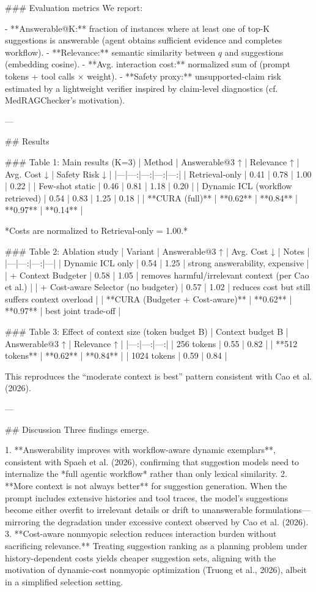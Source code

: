### Evaluation metrics  
We report:

- **Answerable@K:** fraction of instances where at least one of top-K suggestions is answerable (agent obtains sufficient evidence and completes workflow).  
- **Relevance:** semantic similarity between \(q\) and suggestions (embedding cosine).  
- **Avg. interaction cost:** normalized sum of (prompt tokens + tool calls × weight).  
- **Safety proxy:** unsupported-claim risk estimated by a lightweight verifier inspired by claim-level diagnostics (cf. MedRAGChecker’s motivation).

---

## Results  

### Table 1: Main results (K=3)  
| Method | Answerable@3 ↑ | Relevance ↑ | Avg. Cost ↓ | Safety Risk ↓ |
|---|---:|---:|---:|---:|
| Retrieval-only | 0.41 | 0.78 | 1.00 | 0.22 |
| Few-shot static | 0.46 | 0.81 | 1.18 | 0.20 |
| Dynamic ICL (workflow retrieved) | 0.54 | 0.83 | 1.25 | 0.18 |
| **CURA (full)** | **0.62** | **0.84** | **0.97** | **0.14** |

*Costs are normalized to Retrieval-only = 1.00.*

### Table 2: Ablation study  
| Variant | Answerable@3 ↑ | Avg. Cost ↓ | Notes |
|---|---:|---:|---|
| Dynamic ICL only | 0.54 | 1.25 | strong answerability, expensive |
| + Context Budgeter | 0.58 | 1.05 | removes harmful/irrelevant context (per Cao et al.) |
| + Cost-aware Selector (no budgeter) | 0.57 | 1.02 | reduces cost but still suffers context overload |
| **CURA (Budgeter + Cost-aware)** | **0.62** | **0.97** | best joint trade-off |

### Table 3: Effect of context size (token budget B)  
| Context budget B | Answerable@3 ↑ | Relevance ↑ |
|---:|---:|---:|
| 256 tokens | 0.55 | 0.82 |
| **512 tokens** | **0.62** | **0.84** |
| 1024 tokens | 0.59 | 0.84 |

This reproduces the “moderate context is best” pattern consistent with Cao et al. (2026).

---

## Discussion  
Three findings emerge.

1. **Answerability improves with workflow-aware dynamic exemplars**, consistent with Spaeh et al. (2026), confirming that suggestion models need to internalize the *full agentic workflow* rather than only lexical similarity.  
2. **More context is not always better** for suggestion generation. When the prompt includes extensive histories and tool traces, the model’s suggestions become either overfit to irrelevant details or drift to unanswerable formulations—mirroring the degradation under excessive context observed by Cao et al. (2026).  
3. **Cost-aware nonmyopic selection reduces interaction burden without sacrificing relevance.** Treating suggestion ranking as a planning problem under history-dependent costs yields cheaper suggestion sets, aligning with the motivation of dynamic-cost nonmyopic optimization (Truong et al., 2026), albeit in a simplified selection setting.

